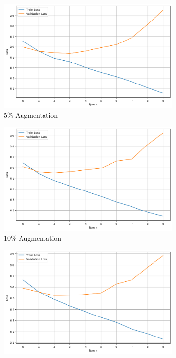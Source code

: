 \documentclass{article}
\begin{document}
\begin{figure}[ht]
  \centering
  \begin{subfigure}[b]{0.3\textwidth}
    \includegraphics[width=\textwidth]{img/synonym_loss_5.png}
    \caption{5\% Augmentation}
    \label{fig:synonym_loss_5}
  \end{subfigure}
  \hfill
  \begin{subfigure}[b]{0.3\textwidth}
    \includegraphics[width=\textwidth]{img/synonym_loss_10.png}
    \caption{10\% Augmentation}
    \label{fig:synonym_loss_10}
  \end{subfigure}
  \hfill
  \begin{subfigure}[b]{0.3\textwidth}
    \includegraphics[width=\textwidth]{img/synonym_loss_20.png}

\end{subfigure}
\end{figure}
\end{document}
